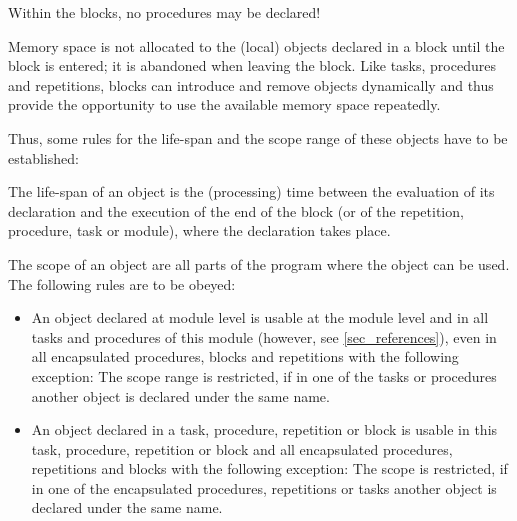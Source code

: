 Within the blocks, no procedures may be declared!

Memory space is not allocated to the (local) objects declared in a block
until the block is entered; it is abandoned when leaving the block. Like
tasks, procedures and repetitions, blocks can introduce and remove
objects dynamically and thus provide the opportunity to use the
available memory space repeatedly.

Thus, some rules for the life-span and the scope range of these objects
have to be established:

The life-span of an object is the (processing) time between the
evaluation of its declaration and the execution of the end of the block
(or of the repetition, procedure, task or module), where the declaration
takes place.


The scope of an object are all parts of the program where the object can
be used. The following rules are to be obeyed:
\begin{itemize}
\item An object declared at module level is usable at the module level
and in all tasks and procedures of this module (however, see 
\ref{sec_references}), even
in all encapsulated procedures, blocks and repetitions with the
following exception: The scope range is restricted, if in one of the
tasks or procedures another object is declared under the same name.
\item An object declared in a task, procedure, repetition or block is
usable in this task, procedure, repetition or block and all
encapsulated procedures, repetitions and blocks with the following
exception: The scope is restricted, if in one of the encapsulated
procedures, repetitions or tasks another object is declared under the
same name.
\end{itemize}

